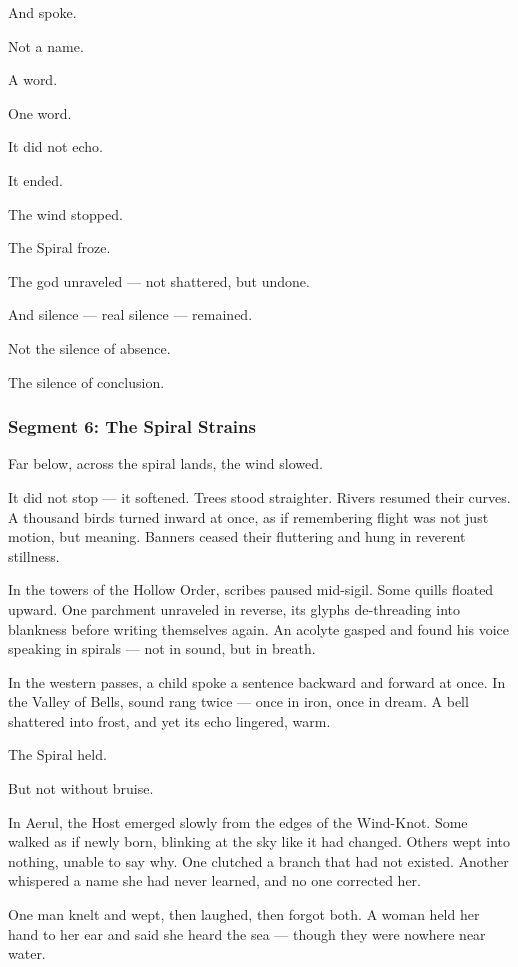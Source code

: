 \documentclass[9pt]{article}
\begin{document}
And spoke.

Not a name.

A word.

One word.

It did not echo.

It ended.

The wind stopped.

The Spiral froze.

The god unraveled — not shattered, but undone.

And silence — real silence — remained.

Not the silence of absence.

The silence of conclusion.

\newpage

\subsubsection*{Segment 6: The Spiral Strains}

Far below, across the spiral lands, the wind slowed.

It did not stop — it softened. Trees stood straighter. Rivers resumed their curves. A thousand birds turned inward at once, as if remembering flight was not just motion, but meaning. Banners ceased their fluttering and hung in reverent stillness.

In the towers of the Hollow Order, scribes paused mid-sigil. Some quills floated upward. One parchment unraveled in reverse, its glyphs de-threading into blankness before writing themselves again. An acolyte gasped and found his voice speaking in spirals — not in sound, but in breath.

In the western passes, a child spoke a sentence backward and forward at once. In the Valley of Bells, sound rang twice — once in iron, once in dream. A bell shattered into frost, and yet its echo lingered, warm.

The Spiral held.

But not without bruise.

In Aerul, the Host emerged slowly from the edges of the Wind-Knot. Some walked as if newly born, blinking at the sky like it had changed. Others wept into nothing, unable to say why. One clutched a branch that had not existed. Another whispered a name she had never learned, and no one corrected her.

One man knelt and wept, then laughed, then forgot both. A woman held her hand to her ear and said she heard the sea — though they were nowhere near water.
\end{document}
